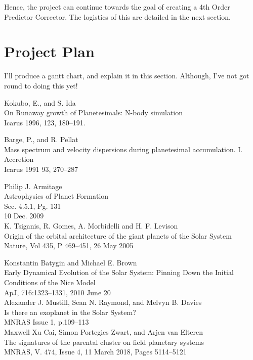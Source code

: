 \documentclass[a4paper,10pt]{article}
\begin{document}
Hence, the project can continue towards the goal of creating a 4th Order Predictor Corrector. The logistics of this are detailed in the next section.

\section{Project Plan}

I'll produce a gantt chart, and explain it in this section. Although, I've not got round to doing this yet!

\begin{thebibliography}{9}

Kokubo, E., and S. Ida\\
On Runaway growth of Planetesimals: N-body simulation\\ 
Icarus 1996, 123, 180--191.

Barge, P., and R. Pellat\\ 
Mass spectrum and velocity dispersions during planetesimal accumulation. I. Accretion\\
Icarus 1991 93, 270--287

Philip J. Armitage\\
Astrophysics of Planet Formation\\
Sec. 4.5.1, Pg. 131\\
10 Dec. 2009\\

K. Tsiganis, R. Gomes, A. Morbidelli and H. F. Levison\\
Origin of the orbital architecture of the giant planets of the Solar System\\ 
Nature, Vol 435, P 469--451, 26 May 2005

Konstantin Batygin and Michael E. Brown\\
Early Dynamical Evolution of the Solar System: Pinning Down the Initial Conditions of the Nice Model\\
 ApJ, 716:1323--1331, 2010 June 20\\

Alexander J. Mustill, Sean N. Raymond, and Melvyn B. Davies\\
Is there an exoplanet in the Solar System?\\
MNRAS Issue 1, p.109--113\\

Maxwell Xu Cai, Simon Portegies Zwart, and Arjen van Elteren\\ 
The signatures of the parental cluster on field planetary systems\\
MNRAS, V. 474, Issue 4, 11 March 2018, Pages 5114--5121\\


\end{thebibliography}
\end{document}

